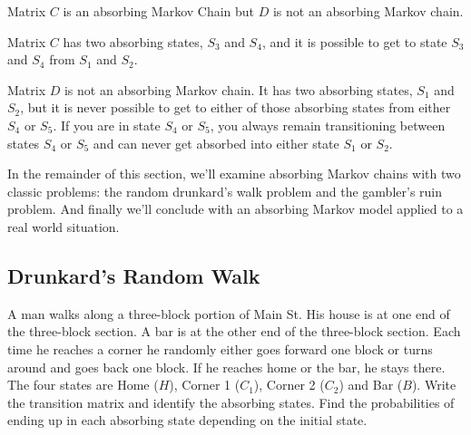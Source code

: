\begin{solution}
    Matrix \( C \) is an absorbing Markov Chain but \( D \) is not an absorbing Markov chain.

    Matrix \( C \) has two absorbing states, \( S_3 \) and \( S_4 \), and it is possible to get to state \( S_3 \) and \( S_4 \) from \( S_1 \) and \( S_2 \).

    Matrix \( D \) is not an absorbing Markov chain. It has two absorbing states, \( S_1 \) and \( S_2 \), but it is never possible to get to either of those absorbing states from either \( S_4 \) or \( S_5 \). If you are in state \( S_4 \) or \( S_5 \), you always remain transitioning between states \( S_4 \) or \( S_5 \) and can never get absorbed into either state \( S_1 \) or \( S_2 \).
\end{solution}





In the remainder of this section, we’ll examine absorbing Markov chains with two classic problems: the random drunkard’s walk problem and the gambler's ruin problem.  And finally we’ll conclude with an absorbing Markov model applied to a real world situation.

\subsection{Drunkard's Random Walk}

\begin{example}
    A man walks along a three-block portion of Main St. His house is at one end of the three-block section. A bar is at the other end of the three-block section. Each time he reaches a corner he randomly either goes forward one block or turns around and goes back one block. If he reaches home or the bar, he stays there. The four states are Home (\(H\)), Corner 1 (\(C_1\)), Corner 2 (\(C_2\)) and Bar (\(B\)). Write the transition matrix and identify the absorbing states. Find the probabilities of ending up in each absorbing state depending on the initial state.
\end{example}

